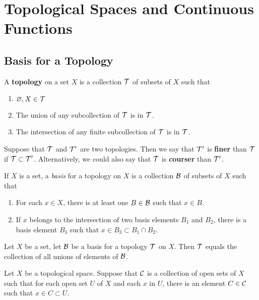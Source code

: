 \setcounter{section}{1}
\section{Topological Spaces and Continuous Functions}

\subsection{Basis for a Topology}\nl

\dfn A \textbf{topology} on a set $X$ is a collection $\mathcal{T}$ of subsets of $X$ such that
\begin{enumerate}
    \item $\varnothing, X\in \mathcal{T}$
    \item The union of any subcollection of $\mathcal{T}$ is in $\mathcal{T}$.
    \item The intersection of any finite subcollection of $\mathcal{T}$ is in $\mathcal{T}$.
\end{enumerate}

\vs

\dfn Suppose that $\mathcal{T}$ and $\mathcal{T}^\prime$ are two topologies. Then we say that $\mathcal{T}^\prime$ is \textbf{finer} than $\mathcal{T}$ if $\mathcal{T} \subset \mathcal{T}^\prime$. Alternatively, we could also say that $\mathcal{T}$ is \textbf{courser} than $\mathcal{T}^\prime$.

\vs

\dfn If $X$ is a set, a \textit{basis} for a topology on $X$ is a collection $\mathcal{B}$ of subsets of $X$ such that
\begin{enumerate}
    \item For each $x\in X$, there is at least one $B\in \mathcal{B}$ such that $x\in B$.
    \item If $x$ belongs to the intersection of two basis elements $B_1$ and $B_2$, there is a basis element $B_3$ such that $x\in B_3\subset B_1\cap B_2$.
\end{enumerate}

\vs

 Let $X$ be a set, let $\mathcal{B}$ be a basis for a topology $\mathcal{T}$ on $X$. Then $\mathcal{T}$ equals the collection of all unions of elements of $\mathcal{B}$.

\vs

 Let $X$ be a topological space. Suppose that $\mathcal{C}$ is a collection of open sets of $X$ such that for each open set $U$ of $X$ and each $x$ in $U$, there is an element $C\in \mathcal{C}$ such that $x\in C\subset U$.


